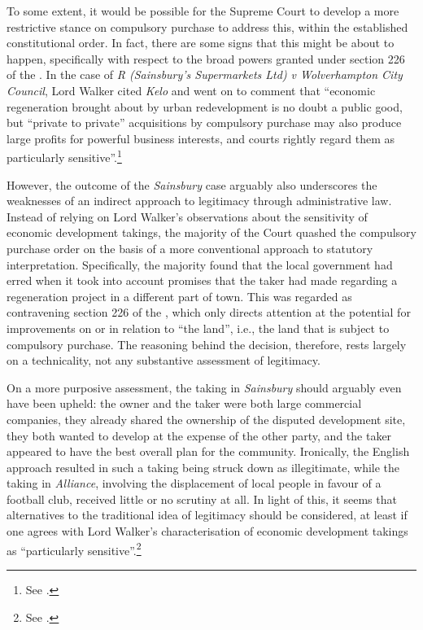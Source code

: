 To some extent, it would be possible for the Supreme Court to develop a more restrictive stance on compulsory purchase to address this, within the established constitutional order. In fact, there are some signs that this might be about to happen, specifically with respect to the broad powers granted under section 226 of the \cite{tcpa90}. In the case of {\it R (Sainsbury's Supermarkets Ltd) v Wolverhampton City Council}, Lord Walker cited {\it Kelo} and went on to comment that ``economic regeneration brought about by urban redevelopment is no doubt a public good, but ``private to private'' acquisitions by compulsory purchase may also produce large profits for powerful business interests, and courts rightly regard them as particularly sensitive''.\footnote{See \cite[82]{sainsbury10}.}

However, the outcome of the {\it Sainsbury} case arguably also underscores the weaknesses of an indirect approach to legitimacy through administrative law. Instead of relying on Lord Walker's observations about the sensitivity of economic development takings, the majority of the Court quashed the compulsory purchase order on the basis of a more conventional approach to statutory interpretation. Specifically, the majority found that the local government had erred when it took into account promises that the taker had made regarding a regeneration project in a different part of town. This was regarded as contravening section 226 of the \cite{tcpa90}, which only directs attention at the potential for improvements on or in relation to ``the land'', i.e., the land that is subject to compulsory purchase. The reasoning behind the decision, therefore, rests largely on a technicality, not any substantive assessment of legitimacy.

On a more purposive assessment, the taking in {\it Sainsbury} should arguably even have been upheld: the owner and the taker were both large commercial companies, they already shared the ownership of the disputed development site, they both wanted to develop at the expense of the other party, and the taker appeared to have the best overall plan for the community. Ironically, the English approach resulted in such a taking being struck down as illegitimate, while the taking in {\it Alliance}, involving the displacement of local people in favour of a football club, received little or no scrutiny at all. In light of this, it seems that alternatives to the traditional idea of legitimacy should be considered, at least if one agrees with Lord Walker's characterisation of economic development takings as ``particularly sensitive''.\footnote{See \cite[82]{sainsbury10}.}


